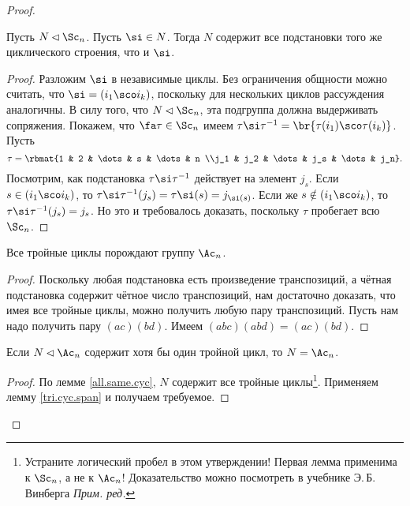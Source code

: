 \documentclass[a4paper]{article}
\begin{document}
\begin{proof}
\begin{lemma}\label{all.same.cyc}
Пусть $N \lhd \Sc_n$. Пусть $\si \in N$. Тогда $N$ содержит все подстановки  того же циклического строения,
что и $\si$.
\end{lemma}
\begin{proof}
Разложим $\si$ в независимые циклы. Без ограничения общности можно считать,  что $\si = (i_1\sco i_k)$,
поскольку для нескольких циклов рассуждения аналогичны. В силу того, что $N \lhd \Sc_n$, эта подгруппа должна
выдерживать сопряжения. Покажем, что $\fa \tau \in \Sc_n$ имеем $\tau \si \tau^{-1} = \br{\tau(i_1)\sco
\tau(i_k)}$. Пусть
$$\tau = \rbmat{1 & 2 & \dots & s & \dots & n \\j_1 & j_2 & \dots & j_s & \dots & j_n}.$$
Посмотрим, как подстановка $\tau\si\tau^{-1}$ действует на элемент $j_s$. Если $s \in (i_1\sco i_k)$,  то
$\tau\si\tau^{-1}(j_s)=\tau\si(s) = j_{\si(s)}$. Если же $s \notin (i_1\sco i_k)$, то $\tau\si\tau^{-1}(j_s)
= j_s$. Но это и требовалось доказать, поскольку $\tau$ пробегает всю $\Sc_n$.
\end{proof}

\begin{lemma}\label{tri.cyc.span}
Все тройные циклы порождают группу $\Ac_n$.
\end{lemma}
\begin{proof}
Поскольку любая подстановка есть произведение транспозиций, а чётная подстановка  содержит чётное число
транспозиций, нам достаточно доказать, что имея все тройные циклы, можно получить любую пару транспозиций.
Пусть нам надо получить пару $(ac)(bd)$. Имеем $(abc)(abd)=(ac)(bd)$.
\end{proof}

\begin{lemma}\label{one.normal}
Если $N \lhd \Ac_n$ содержит хотя бы один тройной цикл, то $N = \Ac_n$.
\end{lemma}
\begin{proof}
По лемме \ref{all.same.cyc}, $N$ содержит все тройные  циклы\footnote{Устраните логический пробел в этом
утверждении! Первая лемма применима к $\Sc_n$, а не к $\Ac_n$! Доказательство можно посмотреть в учебнике
Э.\,Б.\,Винберга \emph{Прим. ред.}}. Применяем лемму \ref{tri.cyc.span} и получаем требуемое.
\end{proof}


\end{proof}
\end{document}

